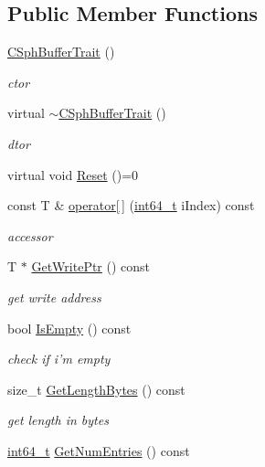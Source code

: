 \subsection*{Public Member Functions}
\begin{DoxyCompactItemize}
\item 
\hyperlink{classCSphBufferTrait_a30c554af2e51e4d47138fbaa661697d5}{C\-Sph\-Buffer\-Trait} ()
\begin{DoxyCompactList}\small\item\em ctor \end{DoxyCompactList}\item 
virtual \hyperlink{classCSphBufferTrait_a6d7c983e4c24baff22c7429f0518325d}{$\sim$\-C\-Sph\-Buffer\-Trait} ()
\begin{DoxyCompactList}\small\item\em dtor \end{DoxyCompactList}\item 
virtual void \hyperlink{classCSphBufferTrait_a53829c71a4d03323c92112d6c8601cf3}{Reset} ()=0
\item 
const T \& \hyperlink{classCSphBufferTrait_a5b14e708de0ef1c7c81c9e39f997c58d}{operator\mbox{[}$\,$\mbox{]}} (\hyperlink{sphinxstd_8h_a996e72f71b11a5bb8b3b7b6936b1516d}{int64\-\_\-t} i\-Index) const 
\begin{DoxyCompactList}\small\item\em accessor \end{DoxyCompactList}\item 
T $\ast$ \hyperlink{classCSphBufferTrait_ac69afa7299b923ff97313ba9d94c81ec}{Get\-Write\-Ptr} () const 
\begin{DoxyCompactList}\small\item\em get write address \end{DoxyCompactList}\item 
bool \hyperlink{classCSphBufferTrait_ab488cde06adedef83a0fb0643d435663}{Is\-Empty} () const 
\begin{DoxyCompactList}\small\item\em check if i'm empty \end{DoxyCompactList}\item 
size\-\_\-t \hyperlink{classCSphBufferTrait_a7762852548af19a4686086f0ef16a16d}{Get\-Length\-Bytes} () const 
\begin{DoxyCompactList}\small\item\em get length in bytes \end{DoxyCompactList}\item 
\hyperlink{sphinxstd_8h_a996e72f71b11a5bb8b3b7b6936b1516d}{int64\-\_\-t} \hyperlink{classCSphBufferTrait_adf4c13b18cd2b235f1973727106c24a3}{Get\-Num\-Entries} () const 

\end{DoxyCompactItemize}
